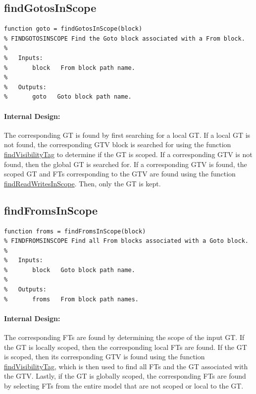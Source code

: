 \documentclass[12pt,letterpaper]{report}
\begin{document}
\subsection{findGotosInScope} \label{findGotosInScope}
\begin{lstlisting}
function goto = findGotosInScope(block)
% FINDGOTOSINSCOPE Find the Goto block associated with a From block.
%
%   Inputs:
%       block   From block path name.
%
%   Outputs:
%       goto   Goto block path name.
\end{lstlisting}
\paragraph{Internal Design:} The corresponding GT is found by first searching for a local GT. If a local GT is not found, the corresponding GTV block is searched for using the function \hyperref[findVisibilityTag]{findVisibilityTag} to determine if the GT is scoped. If a corresponding GTV is not found, then the global GT is searched for. If a corresponding GTV is found, the scoped GT and FTs corresponding to the GTV are found using the function \hyperref[findReadWritesInScope]{findReadWritesInScope}. Then, only the GT is kept.

\subsection{findFromsInScope} \label{findFromsInScope}
\begin{lstlisting}
function froms = findFromsInScope(block)
% FINDFROMSINSCOPE Find all From blocks associated with a Goto block.
%
%   Inputs:
%       block   Goto block path name.
%
%   Outputs:
%       froms   From block path names.
\end{lstlisting}
\paragraph{Internal Design:} The corresponding FTs are found by determining the scope of the input GT. If the GT is locally scoped, then the corresponding local FTs are found. If the GT is scoped, then its corresponding GTV is found using the function \hyperref[findVisibilityTag]{findVisibilityTag}, which is then used to find all FTs and the GT associated with the GTV. Lastly, if the GT is globally scoped, the corresponding FTs are found by selecting FTs from the entire model that are not scoped or local to the GT.


\end{document}
